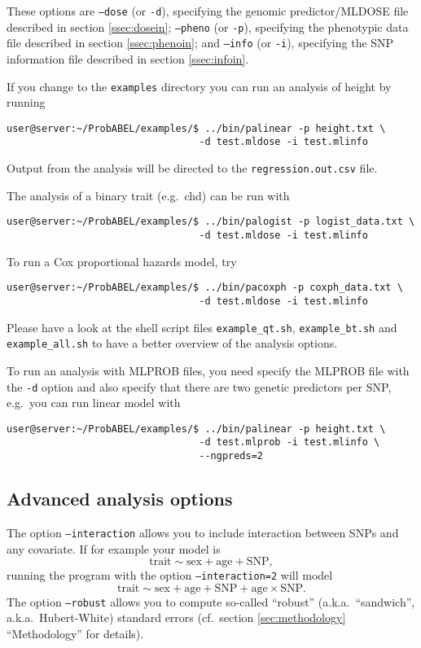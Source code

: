 \documentclass[12pt,a4paper]{article}
\begin{document}
These options are
\texttt{--dose} (or \texttt{-d}),
specifying the genomic predictor/MLDOSE file described in section \ref{ssec:dosein};
\texttt{--pheno} (or \texttt{-p}),
specifying the phenotypic data file described in section \ref{ssec:phenoin}; and
\texttt{--info} (or \texttt{-i}),
specifying the SNP information file described in section \ref{ssec:infoin}.

If you change to the \texttt{examples} directory you can run
an analysis of height by running
\begin{verbatim}
user@server:~/ProbABEL/examples/$ ../bin/palinear -p height.txt \
                                 -d test.mldose -i test.mlinfo
\end{verbatim}
Output from the analysis will be directed to the
\texttt{regression.out.csv} file.

The analysis of a binary trait (e.g.~chd) can be run with
\begin{verbatim}
user@server:~/ProbABEL/examples/$ ../bin/palogist -p logist_data.txt \
                                 -d test.mldose -i test.mlinfo
\end{verbatim}

To run a Cox proportional hazards model, try
\begin{verbatim}
user@server:~/ProbABEL/examples/$ ../bin/pacoxph -p coxph_data.txt \
                                 -d test.mldose -i test.mlinfo
\end{verbatim}

Please have a look at the shell script files \texttt{example\_qt.sh},
\texttt{example\_bt.sh} and \texttt{example\_all.sh} to have
a better overview of the analysis options.

To run an analysis with MLPROB files, you need specify the MLPROB file
with the \texttt{-d} option and also specify that there are two
genetic predictors per SNP, e.g.~you can run linear model with
\begin{verbatim}
user@server:~/ProbABEL/examples/$ ../bin/palinear -p height.txt \
                                 -d test.mlprob -i test.mlinfo \
                                 --ngpreds=2
\end{verbatim}

\subsection{Advanced analysis options}
The option \texttt{--interaction} allows you to include interaction
between SNPs and any covariate. If for example your model is
\begin{equation*}
  \textrm{trait} \sim \textrm{sex} + \textrm{age} + \textrm{SNP},
\end{equation*}
running the program with the option \texttt{--interaction=2} will model
\begin{equation*}
  \textrm{trait} \sim \textrm{sex} + \textrm{age} + \textrm{SNP} +
  \textrm{age} \times \mathrm{SNP}.
\end{equation*}
The option \texttt{--robust} allows you to compute so-called
``robust'' (a.k.a.~``sandwich'', a.k.a.~Hubert-White) standard errors
(cf.~section \ref{sec:methodology} ``Methodology'' for details).
\end{document}
